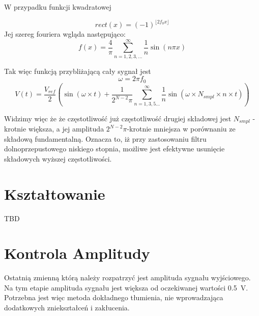 \documentclass[12pt, a4paper]{article}
\begin{document}
\begin{lemma}
	W przypadku funkcji kwadratowej
	
	\begin{equation}
		rect(x) = (-1)^{\lfloor	2 f_0 x \rfloor}
	\end{equation}
	Jej szereg fouriera wgląda następująco:
	\begin{equation}
			f(x) = \frac{4}{\pi} \sum_{n=1,2,3,...}^{\infty} \frac{1}{n} \sin \left( n \pi x \right)
	\end{equation}
\end{lemma}

\begin{theorem}
Tak więc funkcją przybliżającą cały sygnał jest
	\begin{equation}
		\omega = 2 \pi f_0 
	\end{equation}
	\begin{equation}
		V(t) = \frac{V_{ref}}{2} \left( \sin \left( \omega \times t \right) + \frac{1}{ 2^{N - 2}\pi} \sum_{n=1,3,5...}^{\infty} \frac{1}{n} \sin \left( \omega \times N_{smpl} \times n \times t \right) \right)
	\end{equation}
\end{theorem}
\fi

Widzimy więc że że częstotliwość już częstotliwość drugiej składowej jest $N_{smpl}$ - krotnie większa, a jej amplituda $2^{N -2}\pi$-krotnie mniejsza w porównaniu ze składową fundamentalną.
Oznacza to, iż przy zastosowaniu filtru dolnoprzepustowego niskiego stopnia, możliwe jest efektywne usunięcie składowych wyższej częstotliwości.

\section{Kształtowanie}

\begin{LARGE}
	TBD
\end{LARGE}

\section{Kontrola Amplitudy}

Ostatnią zmienną którą należy rozpatrzyć jest amplituda sygnału wyjściowego. Na tym etapie amplituda sygnału jest większa od oczekiwanej wartości
\qty{0,5}{\V}. Potrzebna jest więc metoda dokładnego tłumienia, nie wprowadzająca dodatkowych zniekształceń i zakłucenia.
\end{document}
